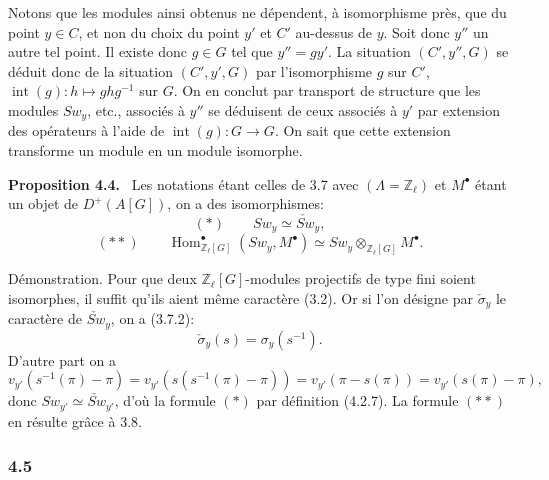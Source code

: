 \documentclass[11pt]{article}
\newenvironment{statement}[1]{\par\medskip\noindent\textbf{#1.}\ }{\par\medskip}
\DeclareMathOperator{\Hom}{Hom}
\providecommand{\Hom}{\operatorname{Hom}}
\providecommand{\Hom}{\operatorname{Hom}}
\begin{document}
Notons que les modules ainsi obtenus ne dépendent, à isomorphisme près, que du point $y\in C$, et non du choix du point $y'$ et $C'$ au-dessus de $y$. Soit donc $y''$ un autre tel point. Il existe donc $g\in G$ tel que $y''=g y'$. La situation $(C',y'',G)$ se déduit donc de la situation $(C',y',G)$ par l'isomorphisme $g$ sur $C'$, $\operatorname{int}(g):h\mapsto ghg^{-1}$ sur $G$. On en conclut par transport de structure que les modules $Sw_y$, etc., associés à $y''$ se déduisent de ceux associés à $y'$ par extension des opérateurs à l'aide de $\operatorname{int}(g):G\to G$. On sait que cette extension transforme un module en un module isomorphe.

\begin{statement}{Proposition 4.4}
Les notations étant celles de 3.7 avec $(\Lambda=\mathbb Z_\ell)$ et $M^\bullet$ étant un objet de $D^+(A[G])$, on a des isomorphismes:
\[
(*)\qquad Sw_y\simeq \check{Sw}_y,
\]
\[
(**)\qquad
\Hom^\bullet_{\mathbb Z_\ell[G]}(Sw_y,M^\bullet)
\simeq Sw_y\otimes_{\mathbb Z_\ell[G]}M^\bullet.
\]
\end{statement}

Démonstration. Pour que deux $\mathbb Z_\ell[G]$-modules projectifs de type fini soient isomorphes, il suffit qu'ils aient même caractère (3.2). Or si l'on désigne par $\check\sigma_y$ le caractère de $\check{Sw}_y$, on a (3.7.2):
\[
\check\sigma_y(s)=\sigma_y(s^{-1}).
\]
D'autre part on a
\[
v_{y'}(s^{-1}(\pi)-\pi)
=v_{y'}(s(s^{-1}(\pi)-\pi))
=v_{y'}(\pi-s(\pi))
=v_{y'}(s(\pi)-\pi),
\]
donc $Sw_{y'}\simeq\check{Sw}_{y'}$, d'où la formule $(*)$ par définition (4.2.7). La formule $(**)$ en résulte grâce à 3.8.

\subsubsection*{4.5}
\end{document}
